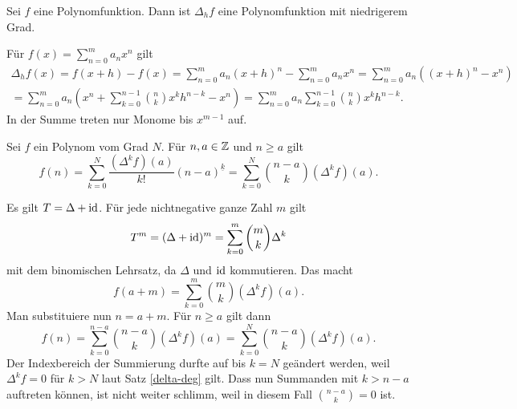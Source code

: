 \begin{Satz}\label{delta-deg}
Sei $f$ eine Polynomfunktion. Dann ist $\Delta_h f$ eine
Polynomfunktion mit niedrigerem Grad.
\end{Satz}
\begin{Beweis} Für $f(x)=\sum_{n=0}^m a_n x^n$ gilt
\begin{gather*}
\Delta_h f(x) = f(x+h) - f(x) = \sum_{n=0}^m a_n (x+h)^n - \sum_{n=0}^m a_n x^n
= \sum_{n=0}^m a_n ((x+h)^n - x^n)\\
= \sum_{n=0}^m a_n (x^n + \sum_{k=0}^{n-1}\binom{n}{k}x^k h^{n-k} - x^n)
= \sum_{n=0}^m a_n \sum_{k=0}^{n-1}\binom{n}{k}x^k h^{n-k}.
\end{gather*}
In der Summe treten nur Monome bis $x^{m-1}$ auf.\,\qedsymbol
\end{Beweis}

\begin{Satz} Sei $f$ ein Polynom vom Grad $N$. Für $n,a\in\mathbb Z$ und $n\ge a$ gilt
\[f(n) = \sum_{k=0}^N \frac{(\Delta^k f)(a)}{k!}(n-a)^{\underline k}
= \sum_{k=0}^N \binom{n-a}{k}(\Delta^k f)(a).\]
\end{Satz}
\begin{Beweis}
Es gilt $T=\Delta+\operatorname{id}$. Für jede nichtnegative ganze Zahl $m$ gilt
\[T^m = (\Delta+\operatorname{id})^m = \sum_{k=0}^m\binom{m}{k}\Delta^k\]
mit dem binomischen Lehrsatz, da $\Delta$ und $\operatorname{id}$ kommutieren. Das macht
\[f(a + m) = \sum_{k=0}^m\binom{m}{k}(\Delta^k f)(a).\]
Man substituiere nun $n = a+m$. Für $n\ge a$ gilt dann
\[f(n) = \sum_{k=0}^{n-a}\binom{n-a}{k}(\Delta^k f)(a)
= \sum_{k=0}^N\binom{n-a}{k}(\Delta^k f)(a).\]
Der Indexbereich der Summierung durfte auf bis $k=N$ geändert werden, weil
$\Delta^k f = 0$ für $k>N$ laut Satz \ref{delta-deg} gilt. Dass nun
Summanden mit $k>n-a$ auftreten können, ist nicht weiter schlimm, weil
in diesem Fall $\binom{n-a}{k}=0$ ist.\,\qedsymbol
\end{Beweis}

